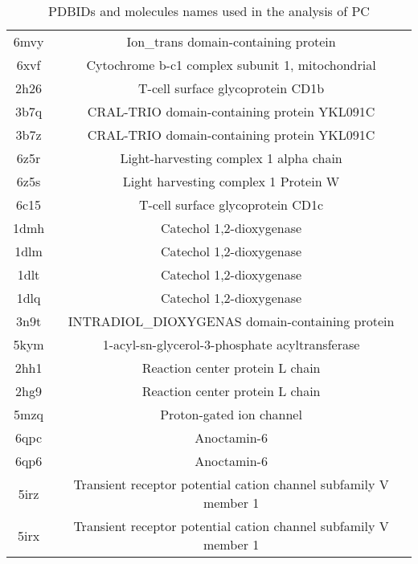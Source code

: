 \documentclass{article}
\begin{document}
\begin{table}[]
\begin{tabular}{c|c}
6mvy & Ion\_trans domain-containing protein \\ 
6xvf & Cytochrome b-c1 complex subunit 1, mitochondrial \\ 
2h26 & T-cell surface glycoprotein CD1b \\ 
3b7q & CRAL-TRIO domain-containing protein YKL091C \\ 
3b7z & CRAL-TRIO domain-containing protein YKL091C \\ 
6z5r & Light-harvesting complex 1 alpha chain \\ 
6z5s & Light harvesting complex 1 Protein W \\ 
6c15 & T-cell surface glycoprotein CD1c \\ 
1dmh & Catechol 1,2-dioxygenase \\ 
1dlm & Catechol 1,2-dioxygenase \\ 
1dlt & Catechol 1,2-dioxygenase \\ 
1dlq & Catechol 1,2-dioxygenase \\ 
3n9t & INTRADIOL\_DIOXYGENAS domain-containing protein \\ 
5kym & 1-acyl-sn-glycerol-3-phosphate acyltransferase \\ 
2hh1 & Reaction center protein L chain \\ 
2hg9 & Reaction center protein L chain \\ 
5mzq & Proton-gated ion channel \\ 
6qpc & Anoctamin-6 \\ 
6qp6 & Anoctamin-6 \\ 
5irz & Transient receptor potential cation channel subfamily V member 1 \\ 
5irx & Transient receptor potential cation channel subfamily V member 1 \\ 
    \end{tabular}
    \caption{PDBIDs and molecules names used in the analysis of PC}
    \label{tab:my_label}
\end{table}
\end{document}

